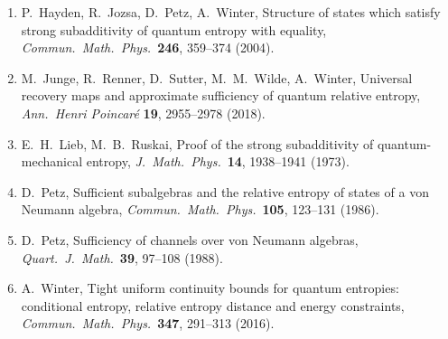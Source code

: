 \documentclass[11pt]{article}
\begin{document}
{\begin{enumerate}[leftmargin=4.3em,labelwidth=3.8em,labelsep=0.5em,align=right,itemsep=0.15ex]
\item[{[HJPW]}] P.~Hayden, R.~Jozsa, D.~Petz, A.~Winter, Structure of states which satisfy strong subadditivity of quantum entropy with equality, \emph{Commun.\ Math.\ Phys.}\ \textbf{246}, 359--374 (2004).
\item[{[JRSWW]}] M.~Junge, R.~Renner, D.~Sutter, M.~M.~Wilde, A.~Winter, Universal recovery maps and approximate sufficiency of quantum relative entropy, \emph{Ann.\ Henri Poincar\'e} \textbf{19}, 2955--2978 (2018).
\item[{[LR]}] E.~H.~Lieb, M.~B.~Ruskai, Proof of the strong subadditivity of quantum-mechanical entropy, \emph{J.\ Math.\ Phys.}\ \textbf{14}, 1938--1941 (1973).
\item[{[P1]}] D.~Petz, Sufficient subalgebras and the relative entropy of states of a von Neumann algebra, \emph{Commun.\ Math.\ Phys.}\ \textbf{105}, 123--131 (1986).
\item[{[P2]}] D.~Petz, Sufficiency of channels over von Neumann algebras, \emph{Quart.\ J.\ Math.}\ \textbf{39}, 97--108 (1988).
\item[{[W]}] A.~Winter, Tight uniform continuity bounds for quantum entropies: conditional entropy, relative entropy distance and energy constraints, \emph{Commun.\ Math.\ Phys.}\ \textbf{347}, 291--313 (2016).
\end{enumerate}
}
\end{document}
